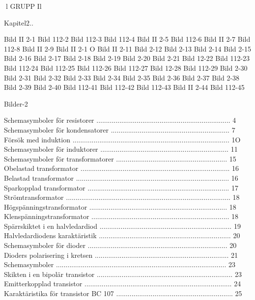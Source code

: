 \documentclass[a4paper,twoside,twocolumn,openright]{book}
\begin{document}
{{{{{{{{{{{l
GRUPP Il

Kapitel2..

Bild II 2-1
Bild 112-2
Bild 112-3
Bild 112-4
Bild II 2-5
Bild 112-6
Bild II 2-7
Bild 112-8
Bild II 2-9
Bild II 2-1 O
Bild II 2-11
Bild 2-12
Bild 2-13
Bild 2-14
Bild 2-15
Bild 2-16
Bild 2-17
Bild 2-18
Bild 2-19
Bild 2-20
Bild 2-21
Bild 12-22
Bild 112-23
Bild 112-24
Bild 112-25
Bild 112-26
Bild 112-27
Bild 12-28
Bild 112-29
Bild 2-30
Bild 2-31
Bild 2-32
Bild 2-33
Bild 2-34
Bild 2-35
Bild 2-36
Bild 2-37
Bild 2-38
Bild 2-39
Bild 2-40
Bild 112-41
Bild 112-42
Bild 112-43
Bild II 2-44
Bild 112-45

Bilder-2

Schemasymboler för resistorer ...................................................................... 4
Schemasymboler för kondensatorer .............................................................. 7
Försök med induktion .................................................................................. 1O
Schemasymboler för induktorer ................................................................... 11
Schemasymboler för transformatorer .......................................................... 15
Obelastad transformator .............................................................................. 16
Belastad transformator ................................................................................ 16
Sparkopplad transformator .......................................................................... 17
Strömtransformator ...................................................................................... 18
Högspänningstransformator ........................................................................ 18
Klenspänningstransformator ........................................................................ 18
Spärrskiktet i en halvledardiod ..................................................................... 19
Halvledardiodens karaktäristik ..................................................................... 20
Schemasymboler för dioder ......................................................................... 20
Dioders polarisering i kretsen ...................................................................... 21
Schemasymboler ......................................................................................... 23
Skikten i en bipolär transistor ....................................................................... 23
Emitterkopplad transistor ............................................................................. 24
Karaktäristika för transistor BC 107 ............................................................. 25
}}}}}}}}}}}
\end{document}
